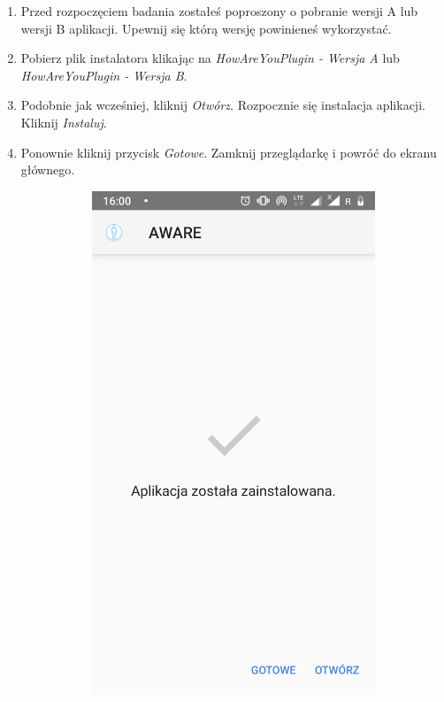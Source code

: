 \begin{enumerate}
	\item Przed rozpoczęciem badania zostałeś poproszony o pobranie wersji A lub wersji B aplikacji. Upewnij się którą wersję powinieneś wykorzystać.
	
	\item Pobierz plik instalatora klikając na \textit{HowAreYouPlugin - Wersja A} lub \textit{HowAreYouPlugin - Wersja B}.
	
	\item Podobnie jak wcześniej, kliknij \textit{Otwórz}. Rozpocznie się instalacja aplikacji. Kliknij \textit{Instaluj}. 
	
	\item Ponownie kliknij przycisk \textit{Gotowe}. Zamknij przeglądarkę i powróć do ekranu głównego.
	
	\begin{figure}[H]
		\centering
		\begin{subfigure}{0.35\textwidth}
			\centering
			\includegraphics[scale=0.13]{dodatekA/2_5.png}

\end{subfigure}
\end{figure}
\end{enumerate}
